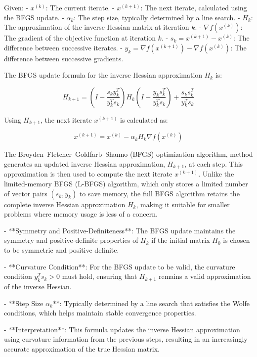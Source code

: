 Given:
- $x^{(k)}$: The current iterate.
- $x^{(k+1)}$: The next iterate, calculated using the BFGS update.
- $\alpha_k$: The step size, typically determined by a line search.
- $H_k$: The approximation of the inverse Hessian matrix at iteration $k$.
- $\nabla f(x^{(k)})$: The gradient of the objective function at iteration $k$.
- $s_k = x^{(k+1)} - x^{(k)}$: The difference between successive iterates.
- $y_k = \nabla f(x^{(k+1)}) - \nabla f(x^{(k)})$: The difference between successive gradients.

The BFGS update formula for the inverse Hessian approximation $H_k$ is:

\[
H_{k+1} = \left(I - \frac{s_k y_k^T}{y_k^T s_k}\right) H_k \left(I - \frac{y_k s_k^T}{y_k^T s_k}\right) + \frac{s_k s_k^T}{y_k^T s_k}
\]

Using $H_{k+1}$, the next iterate $x^{(k+1)}$ is calculated as:

\[
x^{(k+1)} = x^{(k)} - \alpha_k H_k \nabla f(x^{(k)})
\]


The Broyden–Fletcher–Goldfarb–Shanno (BFGS) optimization algorithm, method generates an updated inverse Hessian approximation, $H_{k+1}$, at each step. This approximation is then used to compute the next iterate $x^{(k+1)}$. Unlike the limited-memory BFGS (L-BFGS) algorithm, which only stores a limited number of vector pairs $(s_k, y_k)$ to save memory, the full BFGS algorithm retains the complete inverse Hessian approximation $H_k$, making it suitable for smaller problems where memory usage is less of a concern.

- **Symmetry and Positive-Definiteness**: The BFGS update maintains the symmetry and positive-definite properties of $H_k$ if the initial matrix $H_0$ is chosen to be symmetric and positive definite.
  
- **Curvature Condition**: For the BFGS update to be valid, the curvature condition $y_k^T s_k > 0$ must hold, ensuring that $H_{k+1}$ remains a valid approximation of the inverse Hessian.
  
- **Step Size $\alpha_k$**: Typically determined by a line search that satisfies the Wolfe conditions, which helps maintain stable convergence properties.

- **Interpretation**: This formula updates the inverse Hessian approximation using curvature information from the previous steps, resulting in an increasingly accurate approximation of the true Hessian matrix.